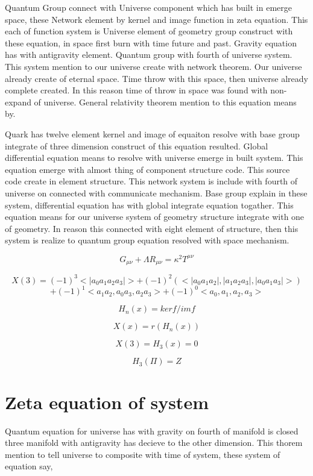 \documentclass{jsarticle}
\begin{document}
    Quantum Group connect with Universe component which has built in emerge space, these Network element by
kernel and image function in zeta equation. This each of function system is Universe element of geometry group
construct with these equation, in space first burn with time future and past. Gravity equation has with
antigravity element. Quantum group with fourth of universe system. This system mention to our universe create
with network theorem. Our universe already create of eternal space. Time throw with this space, then universe
already complete created. In this reason time of throw in space was found with non-expand of universe.
General relativity theorem mention to this equation means by.

   Quark has twelve element kernel and image of equaiton resolve with base group integrate of three dimension
construct of this equation resulted. Global differential equation means to resolve with universe emerge in
built system. This equation emerge with almost thing of component structure code. This source code create in
element structure. This network system is include with fourth of universe on connected with communicate mechanism.
Base group explain in these system, differential equation has with global integrate equation togather. This equation
means for our universe system of geometry structure integrate with one of geometry. In reason this connected with
eight element of structure, then this system is realize to quantum group equation resolved with space mechanism.


$$ G_{\mu\nu} + \Lambda R_{\mu\nu} = \kappa^2 T^{\mu\nu} $$

$$ X(3) = (-1)^3 <|a_{0} a_{1} a_{2} a_{3}|> + (-1)^2 (<|a_{0}a_{1}a_{2}|, |a_{1}a_{2}a_{3}|, |a_{0}a_{1}a_{3}|>) $$
$$    + (-1)^1 <a_{1}a_{2}, a_{0}a_{3}, a_{2}a_{3}> + (-1)^0 <a_{0}, a_{1}, a_{2}, a_{3}> $$

    $$ H_{n} (x) = kerf/imf $$

    $$ X(x) = r(H_{n}(x)) $$

    $$ X(3) = H_{3}(x) = 0 $$

    $$ H_{3}(\Pi) = Z $$

\section{Zeta equation of system}

   Quantum equation for universe has with gravity on fourth of manifold is closed three manifold with antigravity
has decieve to the other dimension. This thorem mention to tell universe to composite with time of system,
these system of equation say, 
\end{document}
